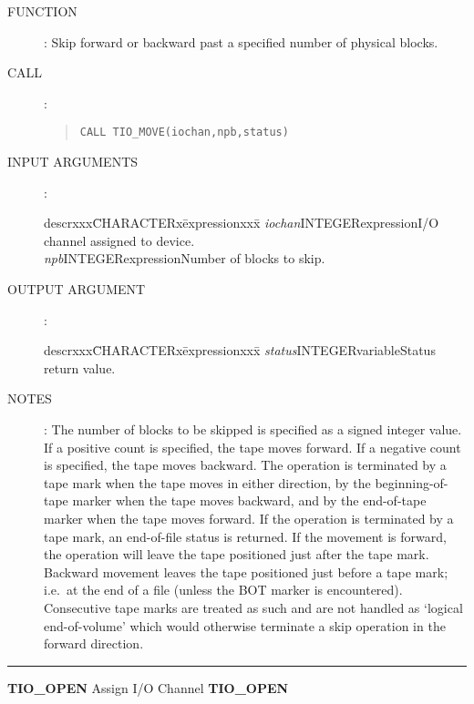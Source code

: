 \begin{description}
\item [FUNCTION]:
Skip forward or backward past a specified number of physical blocks.
\item [CALL]:
\begin{quote}
{\tt CALL TIO\_MOVE(iochan,npb,status)}
\end{quote}
\item [INPUT ARGUMENTS]:
\begin{tabbing}
descrxxx\=CHARACTERx\=expressionxxx\=\kill
{\em iochan}\>INTEGER\>expression\>I/O channel assigned to device.\\
{\em npb}\>INTEGER\>expression\>Number of blocks to skip.
\end{tabbing}
\item [OUTPUT ARGUMENT]:
\begin{tabbing}
descrxxx\=CHARACTERx\=expressionxxx\=\kill
{\em status}\>INTEGER\>variable\>Status return value.
\end{tabbing}
\item [NOTES]:
The number of blocks to be skipped is specified as a signed integer value.
If a positive count is specified, the tape moves forward.
If a negative count is specified, the tape moves backward.
The operation is terminated by a tape mark when the tape moves in either
direction, by the beginning-of-tape marker when the tape moves backward, and by
the end-of-tape marker when the tape moves forward.
If the operation is terminated by a tape mark, an end-of-file status is
returned.
If the movement is forward, the operation will leave the tape positioned just
after the tape mark.
Backward movement leaves the tape positioned just before a tape mark; i.e.\
at the end of a file (unless the BOT marker is encountered).
Consecutive tape marks are treated as such and are not handled as `logical
end-of-volume' which would otherwise terminate a skip operation in the forward
direction.
\end{description}
\goodbreak
\rule{\textwidth}{0.3mm}
{\Large {\bf TIO\_OPEN} \hfill Assign I/O Channel \hfill {\bf TIO\_OPEN}}
